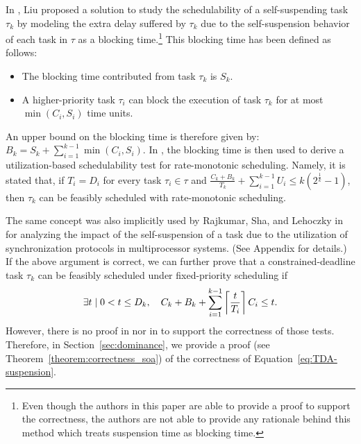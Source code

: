 In \cite[p. 164-165]{Liu:2000:RS:518501}, Liu proposed a solution to study the schedulability of a self-suspending task $\tau_k$ by modeling the extra delay suffered by $\tau_k$ due to the self-suspension behavior of each task in $\tau$ as a blocking time.\footnote{Even though the authors in this paper are able to provide a proof to support the correctness, the authors are not able to provide any rationale behind this method which treats suspension time as blocking time.} This blocking time has been defined as follows:
\begin{itemize}
\item The blocking time contributed from task $\tau_k$ is $S_k$. 
\item A higher-priority task $\tau_i$ can block the execution of task $\tau_k$ for at most $\min(C_i, S_i)$ time units.
\end{itemize}
An upper bound on the blocking time is therefore given by:
$B_k = S_k + \sum_{i=1}^{k-1} \min(C_i, S_i).$
In \cite{Liu:2000:RS:518501}, the blocking time is then used to derive a utilization-based schedulability test for rate-monotonic scheduling. Namely, it is stated that, if $T_i=D_i$ for every task $\tau_i \in \tau$ and $\frac{C_k+B_k}{T_k} + \sum_{i=1}^{k-1} U_i \leq k (2^{\frac{1}{k}}-1)$, then $\tau_k$ can be feasibly scheduled with rate-monotonic scheduling. 
  

The same concept was also implicitly used by Rajkumar, Sha, and Lehoczky in~\cite[p. 267]{DBLP:conf/rtss/RajkumarSL88} for analyzing the impact of the self-suspension of a task due to the utilization of synchronization protocols in multiprocessor systems. (See Appendix\citetechreport{} for details.)
If the above argument is correct, we can further prove that a constrained-deadline task $\tau_k$ can be feasibly scheduled under fixed-priority scheduling if
\begin{equation}
\label{eq:TDA-suspension}
\exists t \mid 0 < t \leq D_k, \quad C_k + B_k + \sum_{i=1}^{k-1}\ceiling{\frac{t}{T_i}} C_i \leq t.
\end{equation}
However, there is no proof in
\cite{Liu:2000:RS:518501} nor in \cite{DBLP:conf/rtss/RajkumarSL88} to support the correctness of those tests. Therefore, in Section~\ref{sec:dominance}, we provide a proof (see Theorem~\ref{theorem:correctness_soa}) of the correctness of Equation~\eqref{eq:TDA-suspension}.

%




